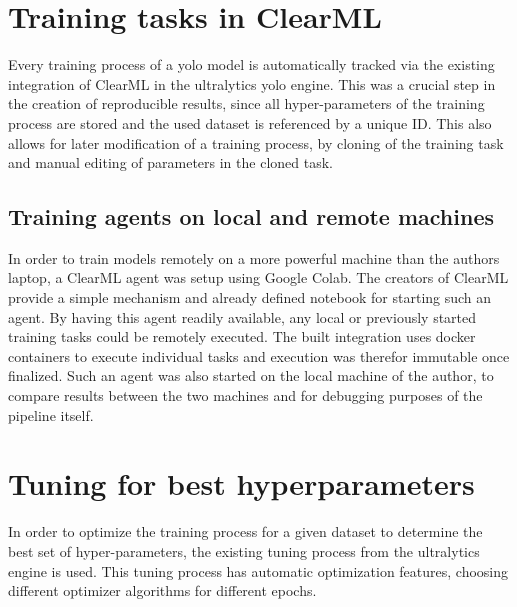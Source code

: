 \documentclass[Bachelor, BIC, english, fhCitStyle, IEEE]{BASE/twbook} %
\begin{document}
\section{Training tasks in ClearML}
Every training process of a \ac{yolo} model is automatically tracked via the existing integration of ClearML in the ultralytics \ac{yolo} engine. This was a crucial step in the creation of reproducible results, since all hyper-parameters of the training process are stored and the used dataset is referenced by a unique ID. This also allows for later modification of a training process, by cloning of the training task and manual editing of parameters in the cloned task.
\subsection{Training agents on local and remote machines}
In order to train models remotely on a more powerful machine than the authors laptop, a ClearML agent was setup using Google Colab. The creators of ClearML provide a simple mechanism and already defined notebook \autocite{ClearMLAgentGoogle} for starting such an agent. By having this agent readily available, any local or previously started training tasks could be remotely executed. The built integration uses docker containers to execute individual tasks and execution was therefor immutable once finalized. Such an agent was also started on the local machine of the author, to compare results between the two machines and for debugging purposes of the pipeline itself.
\section{Tuning for best hyperparameters}
In order to optimize the training process for a given dataset to determine the best set of hyper-parameters, the existing tuning process from the ultralytics engine \autocite{ultralyticsTuner} is used. This tuning process has automatic optimization features, choosing different optimizer algorithms for different epochs.
\end{document}

